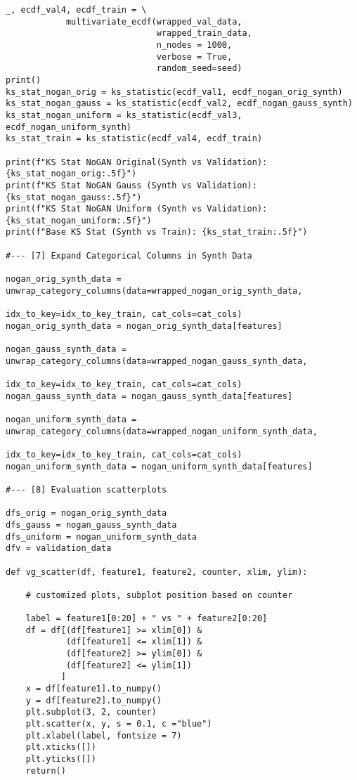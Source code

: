 \documentclass[oneside,10pt]{book}
\begin{document}
\begin{lstlisting}
_, ecdf_val4, ecdf_train = \
            multivariate_ecdf(wrapped_val_data,
                              wrapped_train_data,
                              n_nodes = 1000,
                              verbose = True,
                              random_seed=seed)
print()
ks_stat_nogan_orig = ks_statistic(ecdf_val1, ecdf_nogan_orig_synth)
ks_stat_nogan_gauss = ks_statistic(ecdf_val2, ecdf_nogan_gauss_synth)
ks_stat_nogan_uniform = ks_statistic(ecdf_val3, ecdf_nogan_uniform_synth)
ks_stat_train = ks_statistic(ecdf_val4, ecdf_train)

print(f"KS Stat NoGAN Original(Synth vs Validation): {ks_stat_nogan_orig:.5f}")
print(f"KS Stat NoGAN Gauss (Synth vs Validation): {ks_stat_nogan_gauss:.5f}")
print(f"KS Stat NoGAN Uniform (Synth vs Validation): {ks_stat_nogan_uniform:.5f}")
print(f"Base KS Stat (Synth vs Train): {ks_stat_train:.5f}")

#--- [7] Expand Categorical Columns in Synth Data

nogan_orig_synth_data = unwrap_category_columns(data=wrapped_nogan_orig_synth_data,
                                                 idx_to_key=idx_to_key_train, cat_cols=cat_cols)
nogan_orig_synth_data = nogan_orig_synth_data[features]

nogan_gauss_synth_data = unwrap_category_columns(data=wrapped_nogan_gauss_synth_data,
                                                 idx_to_key=idx_to_key_train, cat_cols=cat_cols)
nogan_gauss_synth_data = nogan_gauss_synth_data[features]

nogan_uniform_synth_data = unwrap_category_columns(data=wrapped_nogan_uniform_synth_data,
                                                 idx_to_key=idx_to_key_train, cat_cols=cat_cols)
nogan_uniform_synth_data = nogan_uniform_synth_data[features]

#--- [8] Evaluation scatterplots

dfs_orig = nogan_orig_synth_data
dfs_gauss = nogan_gauss_synth_data
dfs_uniform = nogan_uniform_synth_data
dfv = validation_data

def vg_scatter(df, feature1, feature2, counter, xlim, ylim):

    # customized plots, subplot position based on counter

    label = feature1[0:20] + " vs " + feature2[0:20]
    df = df[(df[feature1] >= xlim[0]) &
            (df[feature1] <= xlim[1]) &
            (df[feature2] >= ylim[0]) &
            (df[feature2] <= ylim[1])
           ]
    x = df[feature1].to_numpy()
    y = df[feature2].to_numpy()
    plt.subplot(3, 2, counter)
    plt.scatter(x, y, s = 0.1, c ="blue")
    plt.xlabel(label, fontsize = 7)
    plt.xticks([])
    plt.yticks([])
    return()


\end{lstlisting}
\end{document}
